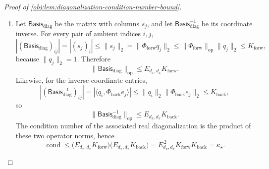 \begin{proof}[Proof of \cref{obj:lem:diagonalization-condition-number-bound}]
\begin{enumerate}
\item Let \(\mathsf{Basis}_{\mathrm{diag}}\) be the matrix with columns \(s_j\), and let \(\mathsf{Basis}_{\mathrm{diag}}^{-1}\) be its coordinate inverse. For every pair of ambient indices \(i,j\),
\[
|(\mathsf{Basis}_{\mathrm{diag}})_{ij}|
=
|(s_j)_i|
\le
\|s_j\|_2
=
\|\Phi_{\mathrm{forw}}q_j\|_2
\le
\|\Phi_{\mathrm{forw}}\|_{\mathrm{op}}\|q_j\|_2
\le
K_{\mathrm{forw}},
\]
because \(\|q_j\|_2=1\). Therefore
\[
\|\mathsf{Basis}_{\mathrm{diag}}\|_{\mathrm{op}}
\le
E_{d_x,d_x}K_{\mathrm{forw}} .
\]
Likewise, for the inverse-coordinate entries,
\[
|(\mathsf{Basis}_{\mathrm{diag}}^{-1})_{ij}|
=
|\langle q_i,\Phi_{\mathrm{back}}e_j\rangle|
\le
\|q_i\|_2\|\Phi_{\mathrm{back}}e_j\|_2
\le
K_{\mathrm{back}},
\]
so
\[
\|\mathsf{Basis}_{\mathrm{diag}}^{-1}\|_{\mathrm{op}}
\le
E_{d_x,d_x}K_{\mathrm{back}} .
\]
The condition number of the associated real diagonalization is the product of these two operator norms, hence
\[
\operatorname{cond}
\le
\bigl(E_{d_x,d_x}K_{\mathrm{forw}}\bigr)
\bigl(E_{d_x,d_x}K_{\mathrm{back}}\bigr)
=
E_{d_x,d_x}^{\,2}K_{\mathrm{forw}}K_{\mathrm{back}}
=
\kappa_\star .
\]
\end{enumerate}
\end{proof}
